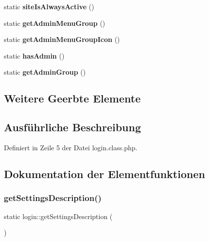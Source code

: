 \begin{DoxyCompactItemize}
\item 
\mbox{\label{classlogin_ae881695209cc939ee4f850101ac7576b}} 
static {\bfseries site\+Is\+Always\+Active} ()
\item 
\mbox{\label{classlogin_a1fdcd0d9086c68573a5c6ed3ef5ba2f5}} 
static {\bfseries get\+Admin\+Menu\+Group} ()
\item 
\mbox{\label{classlogin_af54ff35b17f7ca0b3b0c1d291ab654ff}} 
static {\bfseries get\+Admin\+Menu\+Group\+Icon} ()
\item 
\mbox{\label{classlogin_acbd5cf3339fcca785764f826e7a9ea81}} 
static {\bfseries has\+Admin} ()
\item 
\mbox{\label{classlogin_a33ec491c7871141513fed3548fb50713}} 
static {\bfseries get\+Admin\+Group} ()
\end{DoxyCompactItemize}
\subsection*{Weitere Geerbte Elemente}


\subsection{Ausführliche Beschreibung}


Definiert in Zeile 5 der Datei login.\+class.\+php.



\subsection{Dokumentation der Elementfunktionen}
\mbox{\label{classlogin_a72c5c4f3647e3756f3b8163e6cd308f2}} 
\subsubsection{\texorpdfstring{get\+Settings\+Description()}{getSettingsDescription()}}
{\footnotesize\ttfamily static login\+::get\+Settings\+Description (\begin{DoxyParamCaption}{ }\end{DoxyParamCaption})\hspace{0.3cm}{\ttfamily [static]}}

